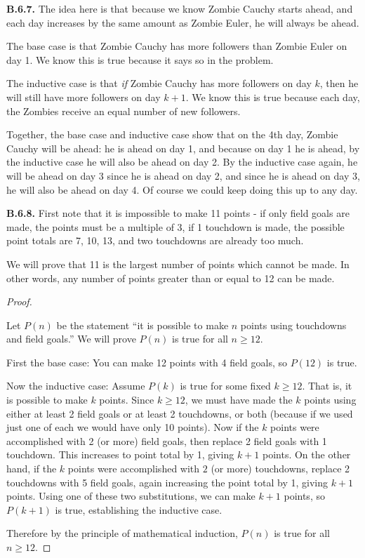 \documentclass[10pt,]{book}
\theoremstyle{plain}
\theoremstyle{definition}
\theoremstyle{definition}
\theoremstyle{definition}
\theoremstyle{definition}
\numberwithin{equation}{chapter}
\begin{document}
\par\smallskip
\noindent\textbf{B.6.7.} \hypertarget{p-2280}{}%
The idea here is that because we know Zombie Cauchy starts ahead, and each day increases by the same amount as Zombie Euler, he will always be ahead.%
\par
\hypertarget{p-2281}{}%
The base case is that Zombie Cauchy has more followers than Zombie Euler on day 1. We know this is true because it says so in the problem.%
\par
\hypertarget{p-2282}{}%
The inductive case is that \emph{if} Zombie Cauchy has more followers on day \(k\), then he will still have more followers on day \(k+1\). We know this is true because each day, the Zombies receive an equal number of new followers.%
\par
\hypertarget{p-2283}{}%
Together, the base case and inductive case show that on the 4th day, Zombie Cauchy will be ahead: he is ahead on day 1, and because on day 1 he is ahead, by the inductive case he will also be ahead on day 2. By the inductive case again, he will be ahead on day 3 since he is ahead on day 2, and since he is ahead on day 3, he will also be ahead on day 4. Of course we could keep doing this up to any day.%
\par\smallskip
\noindent\textbf{B.6.8.} \hypertarget{p-2285}{}%
First note that it is impossible to make 11 points - if only field goals are made, the points must be a multiple of 3, if 1 touchdown is made, the possible point totals are 7, 10, 13, \textellipsis{} and two touchdowns are already too much.%
\par
\hypertarget{p-2286}{}%
We will prove that 11 is the largest number of points which cannot be made. In other words, any number of points greater than or equal to 12 can be made.%
\begin{proof}\hypertarget{proof-47}{}
\hypertarget{p-2287}{}%
Let \(P(n)\) be the statement ``it is possible to make \(n\) points using touchdowns and field goals.'' We will prove \(P(n)\) is true for all \(n \ge 12\).%
\par
\hypertarget{p-2288}{}%
First the base case: You can make 12 points with 4 field goals, so \(P(12)\) is true.%
\par
\hypertarget{p-2289}{}%
Now the inductive case: Assume \(P(k)\) is true for some fixed \(k \ge 12\). That is, it is possible to make \(k\) points. Since \(k \ge 12\), we must have made the \(k\) points using either at least 2 field goals or at least 2 touchdowns, or both (because if we used just one of each we would have only 10 points). Now if the \(k\) points were accomplished with 2 (or more) field goals, then replace 2 field goals with 1 touchdown. This increases to point total by 1, giving \(k + 1\) points. On the other hand, if the \(k\) points were accomplished with \(2\) (or more) touchdowns, replace 2 touchdowns with 5 field goals, again increasing the point total by 1, giving \(k+1\) points. Using one of these two substitutions, we can make \(k+1\) points, so \(P(k+1)\) is true, establishing the inductive case.%
\par
\hypertarget{p-2290}{}%
Therefore by the principle of mathematical induction, \(P(n)\) is true for all \(n \ge 12\).%
\end{proof}
\end{document}
